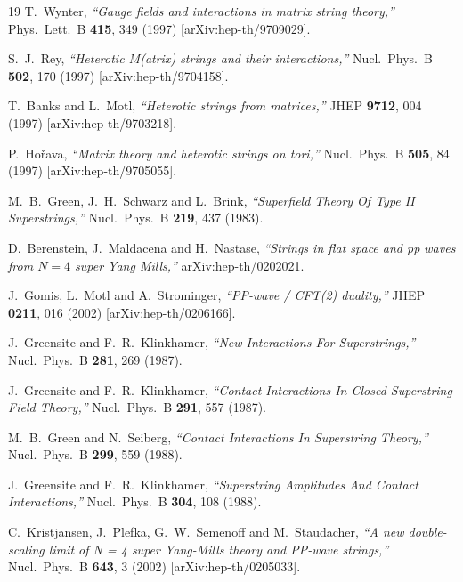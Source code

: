 \documentclass[nohyper,12pt,letterpaper]{JHEP3}
\begin{document}
\begin{thebibliography}{19}
T.~Wynter,
{\it ``Gauge fields and interactions in matrix string theory,''}
Phys.\ Lett.\ B {\bf 415}, 349 (1997)
[arXiv:hep-th/9709029].

S.~J.~Rey,
{\it ``Heterotic M(atrix) strings and their interactions,''}
Nucl.\ Phys.\ B {\bf 502}, 170 (1997)
[arXiv:hep-th/9704158].

T.~Banks and L.~Motl,
{\it ``Heterotic strings from matrices,''}
JHEP {\bf 9712}, 004 (1997)
[arXiv:hep-th/9703218].

P.~Ho\v{r}ava,
{\it ``Matrix theory and heterotic strings on tori,''}
Nucl.\ Phys.\ B {\bf 505}, 84 (1997)
[arXiv:hep-th/9705055].

M.~B.~Green, J.~H.~Schwarz and L.~Brink,
{\it ``Superfield Theory Of Type II Superstrings,''}
Nucl.\ Phys.\ B {\bf 219}, 437 (1983).

D.~Berenstein, J.~Maldacena and H.~Nastase,
{\it ``Strings in flat space and pp waves from $N=4$ super Yang Mills,''}
arXiv:hep-th/0202021.

J.~Gomis, L.~Motl and A.~Strominger,
{\it ``PP-wave / CFT(2) duality,''}
JHEP {\bf 0211}, 016 (2002)
[arXiv:hep-th/0206166].

J.~Greensite and F.~R.~Klinkhamer,
{\it ``New Interactions For Superstrings,''}
Nucl.\ Phys.\ B {\bf 281}, 269 (1987).

J.~Greensite and F.~R.~Klinkhamer,
{\it ``Contact Interactions In Closed Superstring Field Theory,''}
Nucl.\ Phys.\ B {\bf 291}, 557 (1987).

M.~B.~Green and N.~Seiberg,
{\it ``Contact Interactions In Superstring Theory,''}
Nucl.\ Phys.\ B {\bf 299}, 559 (1988).

J.~Greensite and F.~R.~Klinkhamer,
{\it ``Superstring Amplitudes And Contact Interactions,''}
Nucl.\ Phys.\ B {\bf 304}, 108 (1988).

C.~Kristjansen, J.~Plefka, G.~W.~Semenoff and M.~Staudacher,
{\it ``A new double-scaling limit of N = 4 super Yang-Mills theory and 
PP-wave strings,''}
Nucl.\ Phys.\ B {\bf 643}, 3 (2002)
[arXiv:hep-th/0205033].


\end{thebibliography}
\end{document}
